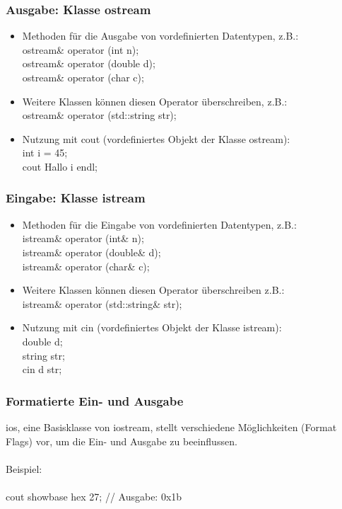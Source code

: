 \subsubsection{Ausgabe: Klasse ostream\hfill}
\label{sec:unterunterabschnitt}
\begin{itemize}
	\item Methoden für die Ausgabe von vordefinierten Datentypen, z.B.:
		\\ ostream\& operator \flq\flq(int n);
		\\ ostream\& operator \flq\flq(double d);
		\\ ostream\& operator \flq\flq(char c);
	\item Weitere Klassen können diesen Operator überschreiben, z.B.:
		\\ ostream\& operator \flq\flq(std::string str);
	\item Nutzung mit cout (vordefiniertes Objekt der Klasse ostream):
		\\ int i = 45;
		\\cout \flq\flq \grqq Hallo  \grqq \flq\flq i \flq\flq endl;
\end{itemize}

\subsubsection{Eingabe: Klasse istream}
\label{sec:unterunterabschnit}
\begin{itemize}
	\item Methoden für die Eingabe von vordefinierten Datentypen, z.B.:
		\\ istream\& operator \frq\frq(int\& n);
		\\ istream\& operator \frq\frq(double\& d);
		\\ istream\& operator \frq\frq(char\& c);
	\item Weitere Klassen können diesen Operator überschreiben z.B.:
		\\ istream\& operator \frq\frq(std::string\& str);
	\item Nutzung mit cin (vordefiniertes Objekt der Klasse istream):
		\\ double d;
		\\ string str;
		\\ cin \frq\frq d \frq\frq str;
\end{itemize}

\subsubsection{Formatierte Ein- und Ausgabe\hfill}
\label{sec:subsubsection}
ios, eine Basisklasse von iostream, stellt verschiedene Möglichkeiten (Format Flags) vor, um die Ein- und Ausgabe zu beeinflussen.
\\ \\
Beispiel:
\\ \\
cout \flq\flq \color{\ownRed} showbase \flq\flq \color{\ownBlue} hex \flq\flq \color{black}27;	// Ausgabe: \color{\ownRed}0x\color{\ownBlue}1b \color{black}

